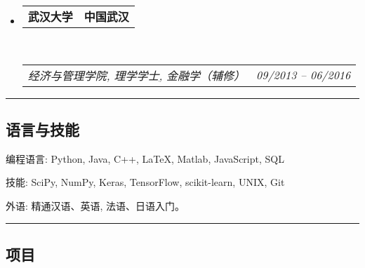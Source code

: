 \documentclass[10pt,letterpaper]{article}
\makeatletter
\newenvironment{indentsection}[1]%
{\begin{list}{}%
	{\setlength{\leftmargin}{#1}}%
	\item[]%
}
{\end{list}}
\newcommand{\headerrow}[2]
{\begin{tabular*}{\linewidth}{l@{\extracolsep{\fill}}r}
	#1 &
	#2 \\
\end{tabular*}}
\makeatother
\begin{document}
\begin{itemize}
	\item 
	\headerrow
		{\textbf{武汉大学}}
		{\textbf{中国武汉}}
	\\
	\headerrow
		{\emph{经济与管理学院, 理学学士\href{https://github.com/skaudrey/cv/blob/master/certificate/certificate.pdf}, 金融学（辅修）}}
		{\emph{09/2013 -- 06/2016}}
	
\end{itemize}

\hrule
\vspace{-0.4em}
\subsection*{语言与技能}

\begin{indentsection}{\parindent}
\begin{description*}
	\item[编程语言:]
	Python, Java, C++, \LaTeX, Matlab, JavaScript, SQL
	\item[技能:]
	SciPy, NumPy, Keras, TensorFlow, scikit-learn, UNIX, Git
	\item[外语:]
	精通汉语、英语, 法语、日语入门。
\end{description*}
\end{indentsection}




\hrule
\vspace{-0.4em}
\subsection*{项目}
\end{document}
